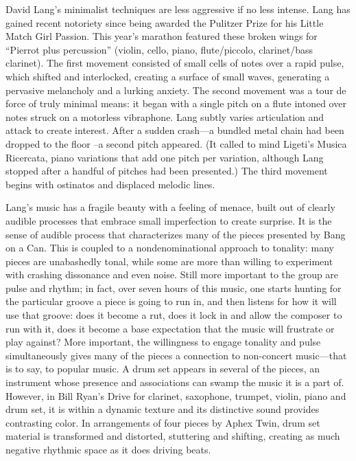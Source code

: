 David Lang’s minimalist techniques are less aggressive if no less intense. Lang has gained recent notoriety since being awarded the Pulitzer Prize for his Little Match Girl Passion. This year’s marathon featured these broken wings for “Pierrot plus percussion” (violin, cello, piano, flute/piccolo, clarinet/bass clarinet). The first movement consisted of small cells of notes over a rapid pulse, which shifted and interlocked, creating a surface of small waves, generating a pervasive melancholy and a lurking anxiety. The second movement was a tour de force of truly minimal means: it began with a single pitch on a flute intoned over notes struck on a motorless vibraphone. Lang subtly varies articulation and attack to create interest. After a sudden crash—a bundled metal chain had been dropped to the floor –a second pitch appeared. (It called to mind Ligeti’s Musica Ricercata, piano variations that add one pitch per variation, although Lang stopped after a handful of pitches had been presented.) The third movement begins with ostinatos and displaced melodic lines.

Lang’s music has a fragile beauty with a feeling of menace, built out of clearly audible processes that embrace small imperfection to create surprise. It is the sense of audible process that characterizes many of the pieces presented by Bang on a Can. This is coupled to a nondenominational approach to tonality: many pieces are unabashedly tonal, while some are more than willing to experiment with crashing dissonance and even noise. Still more important to the group are pulse and rhythm; in fact, over seven hours of this music, one starts hunting for the particular groove a piece is going to run in, and then listens for how it will use that groove: does it become a rut, does it lock in and allow the composer to run with it, does it become a base expectation that the music will frustrate or play against? More important, the willingness to engage tonality and pulse simultaneously gives many of the pieces a connection to non-concert music—that is to say, to popular music. A drum set appears in several of the pieces, an instrument whose presence and associations can swamp the music it is a part of. However, in Bill Ryan’s Drive for clarinet, saxophone, trumpet, violin, piano and drum set, it is within a dynamic texture and its distinctive sound provides contrasting color. In arrangements of four pieces by Aphex Twin, drum set material is transformed and distorted, stuttering and shifting, creating as much negative rhythmic space as it does driving beats.

